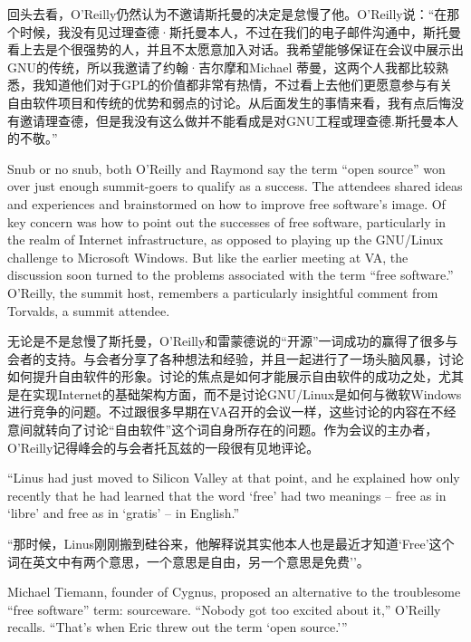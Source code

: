 \ifdefined\chs
回头去看，O'Reilly仍然认为不邀请斯托曼的决定是怠慢了他。O'Reilly说：``在那个时候，我没有见过理查德·斯托曼本人，不过在我们的电子邮件沟通中，斯托曼看上去是个很强势的人，并且不太愿意加入对话。我希望能够保证在会议中展示出GNU的传统，所以我邀请了约翰·吉尔摩和Michael 蒂曼，这两个人我都比较熟悉，我知道他们对于GPL的价值都非常有热情，不过看上去他们更愿意参与有关自由软件项目和传统的优势和弱点的讨论。从后面发生的事情来看，我有点后悔没有邀请理查德，但是我没有这么做并不能看成是对GNU工程或理查德.斯托曼本人的不敬。''
\fi

\ifdefined\eng
Snub or no snub, both O'Reilly and Raymond say the term ``open source'' won over just enough summit-goers to qualify as a success. The attendees shared ideas and experiences and brainstormed on how to improve free software's image. Of key concern was how to point out the successes of free software, particularly in the realm of Internet infrastructure, as opposed to playing up the GNU/Linux challenge to Microsoft Windows. But like the earlier meeting at VA, the discussion soon turned to the problems associated with the term ``free software.'' O'Reilly, the summit host, remembers a particularly insightful comment from Torvalds, a summit attendee.
\fi

\ifdefined\chs
无论是不是怠慢了斯托曼，O'Reilly和雷蒙德说的``开源''一词成功的赢得了很多与会者的支持。与会者分享了各种想法和经验，并且一起进行了一场头脑风暴，讨论如何提升自由软件的形象。讨论的焦点是如何才能展示自由软件的成功之处，尤其是在实现Internet的基础架构方面，而不是讨论GNU/Linux是如何与微软Windows进行竞争的问题。不过跟很多早期在VA召开的会议一样，这些讨论的内容在不经意间就转向了讨论``自由软件''这个词自身所存在的问题。作为会议的主办者，O'Reilly记得峰会的与会者托瓦兹的一段很有见地评论。
\fi

\ifdefined\eng
``Linus had just moved to Silicon Valley at that point, and he explained how only recently that he had learned that the word `free' had two meanings -- free as in `libre' and free as in `gratis' -- in English.''
\fi

\ifdefined\chs
``那时候，Linus刚刚搬到硅谷来，他解释说其实他本人也是最近才知道`Free'这个词在英文中有两个意思，一个意思是自由，另一个意思是免费''。
\fi

\ifdefined\eng
Michael Tiemann, founder of Cygnus, proposed an alternative to the troublesome ``free software'' term: sourceware. ``Nobody got too excited about it,'' O'Reilly recalls. ``That's when Eric threw out the term `open source.'\hspace{0.01in}''
\fi


